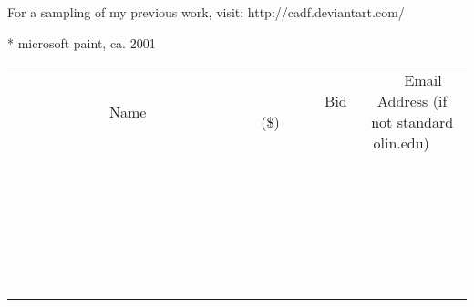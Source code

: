 \documentclass[11pt]{article}
\begin{document}
For a sampling of my previous work, visit:
http://cadf.deviantart.com/

* microsoft paint, ca. 2001
\\[6ex]
\begin{tabular}{c c c}
~~~~~~~~~~~~~Name~~~~~~~~~~~~~ & ~~~~~~~~~Bid (\$)~~~~~~~~~  & ~~~Email Address (if not standard olin.edu)~~~\\
 & & \\
\hline
 & & \\
\hline
 & & \\
\hline
 & & \\
\hline
 & & \\
\hline
 & & \\
\hline
 & & \\
\hline
 & & \\
\hline
 & & \\
\hline
 & & \\
\hline
 & & \\
\hline
 & & \\
\hline
 & & \\
\hline
 & & \\
\hline
 & & \\
\hline
 & & \\
\hline
 & & \\
\hline
 & & \\
\hline
 & & \\
\hline
 & & \\
\hline
 & & \\
\hline
 & & \\
\hline
 & & \\
\hline
 & & \\
\hline
 & & \\
\hline
 & & \\
\hline
\end{tabular}
\newpage
\end{document}
